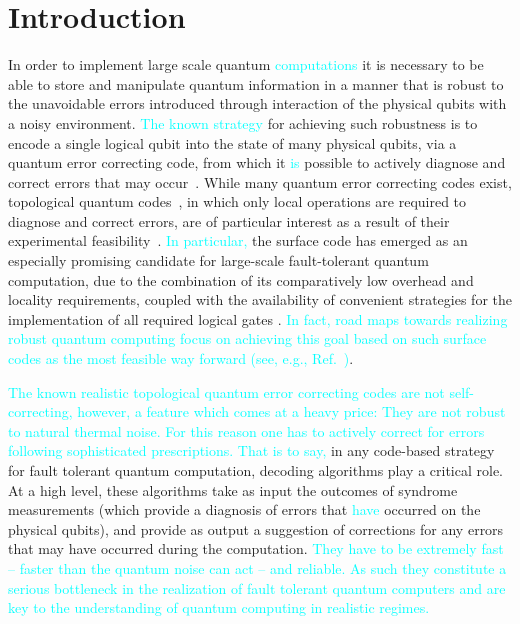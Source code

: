 \documentclass[twocolumn,preprintnumbers,amsmath,amssymb,notitlepage,nofootinbib,longbibliography,superscriptaddress,aps,pra,10pt]{revtex4-1}
\newcommand{\je}[1]{\textcolor{cyan}{#1}}
\begin{document}
\section{Introduction}\label{s:introduction}
	In order to implement large scale quantum \je{computations} it is necessary to be able to store and manipulate quantum information in a manner that is robust to the unavoidable errors introduced through interaction of the physical qubits with a noisy environment.
	\je{The known strategy} for achieving such robustness is to encode a single logical qubit into the state of many physical qubits, via a quantum error correcting code, from which it
	\je{is} possible to actively diagnose and correct errors that may occur~\cite{Terhal15,Campbell17}.
	While many quantum error correcting codes exist, topological quantum codes~\cite{Kitaev03, Dennis02, Preskill17lectures, Nayak08, Pachos12, Terhal15, Brown16, Campbell17}, in which only local operations are required to diagnose and correct errors, are of particular interest as a result of their experimental feasibility~\cite{Reed12, Barends14, Nigg14, Corcoles15, Albrecht16, Takita16, Linke17}.
	\je{In particular,} the surface code has emerged as an especially promising candidate for large-scale fault-tolerant quantum computation, due to the combination of its comparatively low overhead and locality requirements, coupled with the availability of convenient strategies for the implementation of all required logical gates \cite{Fowler18,Litinski18b}. \je{In fact, road maps towards realizing robust quantum computing focus on achieving this goal based on such surface codes as the
	most feasible way forward  (see, e.g., Ref.~\cite{Roadmap})}.

	\je{The known realistic topological quantum error correcting codes are not self-correcting, however, a feature which comes at a heavy price: They are not robust
	to natural thermal noise. For this reason one has to actively correct for errors following sophisticated prescriptions. That is to say,} in any code-based strategy for fault tolerant quantum computation, decoding algorithms play a critical role.
	At a high level, these algorithms take as input the outcomes of syndrome measurements (which provide a diagnosis of errors that \je{have} occurred on the physical qubits), and provide as output a suggestion of corrections for any errors that may have occurred during the computation. \je{They have to be extremely
	fast -- faster than the quantum noise can act -- and reliable.
	As such they constitute a serious bottleneck in the realization of fault tolerant quantum computers and are key to the understanding of quantum
	computing in realistic regimes.}
\end{document}
